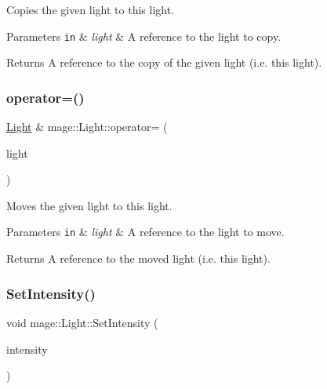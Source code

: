 Copies the given light to this light.


\begin{DoxyParams}[1]{Parameters}
\mbox{\tt in}  & {\em light} & A reference to the light to copy. \\
\hline
\end{DoxyParams}
\begin{DoxyReturn}{Returns}
A reference to the copy of the given light (i.\+e. this light). 
\end{DoxyReturn}
\hypertarget{classmage_1_1_light_a5fd2edc3fcbcc1dbe7a2620b76cedd25}{}\label{classmage_1_1_light_a5fd2edc3fcbcc1dbe7a2620b76cedd25} 
\subsubsection{\texorpdfstring{operator=()}{operator=()}\hspace{0.1cm}{\footnotesize\ttfamily [2/2]}}
{\footnotesize\ttfamily \hyperlink{classmage_1_1_light}{Light} \& mage\+::\+Light\+::operator= (\begin{DoxyParamCaption}\item[{\hyperlink{classmage_1_1_light}{Light} \&\&}]{light }\end{DoxyParamCaption})\hspace{0.3cm}{\ttfamily [default]}}

Moves the given light to this light.


\begin{DoxyParams}[1]{Parameters}
\mbox{\tt in}  & {\em light} & A reference to the light to move. \\
\hline
\end{DoxyParams}
\begin{DoxyReturn}{Returns}
A reference to the moved light (i.\+e. this light). 
\end{DoxyReturn}
\hypertarget{classmage_1_1_light_ab7312aee7c5f7b4b564e27592e1b4223}{}\label{classmage_1_1_light_ab7312aee7c5f7b4b564e27592e1b4223} 
\subsubsection{\texorpdfstring{Set\+Intensity()}{SetIntensity()}\hspace{0.1cm}{\footnotesize\ttfamily [1/2]}}
{\footnotesize\ttfamily void mage\+::\+Light\+::\+Set\+Intensity (\begin{DoxyParamCaption}\item[{const \hyperlink{structmage_1_1_r_g_b_spectrum}{R\+G\+B\+Spectrum} \&}]{intensity }\end{DoxyParamCaption})\hspace{0.3cm}{\ttfamily [noexcept]}}

